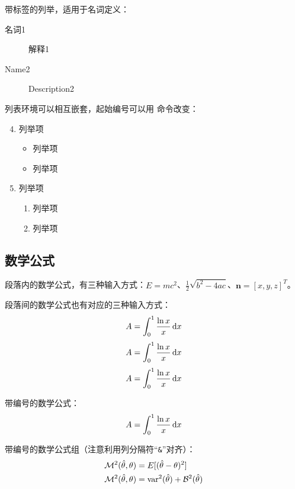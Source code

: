带标签的列举，适用于名词定义：
\begin{description}
	\item[名词1] 解释1
	\item[Name2] Description2
\end{description}

列表环境可以相互嵌套，起始编号可以用  命令改变：
\begin{enumerate}
    \setcounter{enumi}{3}
	\item 列举项
    \begin{itemize}
    	\item 列举项
    	\item 列举项
    \end{itemize}
	\item 列举项
	\begin{enumerate}
    	\item 列举项
    	\item 列举项
	\end{enumerate}
\end{enumerate}


\subsection{数学公式}
段落内的数学公式，有三种输入方式：$E=mc^2$、\(\frac{1}{2}\sqrt{b^2-4ac}\)、\begin{math}\mathbf{n}=[x, y, z]^T\end{math}。

段落间的数学公式也有对应的三种输入方式：
$$A=\int_0^1 \frac{\ln{x}}{x}\mathop{}\!\mathrm{d} x$$
\[
A=\int_0^1 \frac{\ln{x}}{x}\mathop{}\!\mathrm{d} x
\]
\begin{displaymath}
A=\int_0^1 \frac{\ln{x}}{x}\mathop{}\!\mathrm{d} x
\end{displaymath}

带编号的数学公式：
\begin{equation}\label{eq:samples:one}
A=\int_0^1 \frac{\ln{x}}{x}\mathop{}\!\mathrm{d} x
\end{equation}

带编号的数学公式组（注意利用列分隔符“\texttt{\&}”对齐）：
\begin{align}
\mathcal{M}^2(\hat{\theta},\theta) &= E[(\hat{\theta} - \theta)^2] \\
\mathcal{M}^2(\hat{\theta},\theta) &= \operatorname{var}^2(\hat{\theta}) + {\cal B}^2(\hat{\theta})
\end{align}

